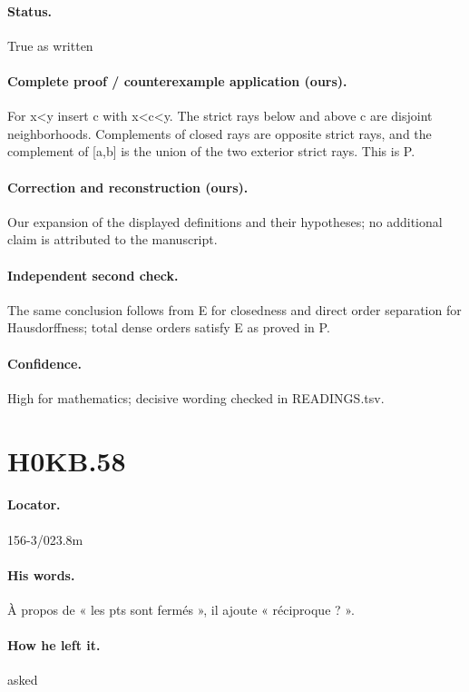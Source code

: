 \paragraph{Status.} True as written

\paragraph{Complete proof / counterexample application (ours).} For x<y insert c with x<c<y. The strict rays below and above c are disjoint neighborhoods. Complements of closed rays are opposite strict rays, and the complement of [a,b] is the union of the two exterior strict rays. This is P.

\paragraph{Correction and reconstruction (ours).} Our expansion of the displayed definitions and their hypotheses; no additional claim is attributed to the manuscript.

\paragraph{Independent second check.} The same conclusion follows from E for closedness and direct order separation for Hausdorffness; total dense orders satisfy E as proved in P.

\paragraph{Confidence.} High for mathematics; decisive wording checked in READINGS.tsv.

\section*{H0KB.58}\label{statement:H0KB.58}
\paragraph{Locator.} 156-3/023.8m

\paragraph{His words.} À propos de « les pts sont fermés », il ajoute « réciproque ? ».

\paragraph{How he left it.} asked

